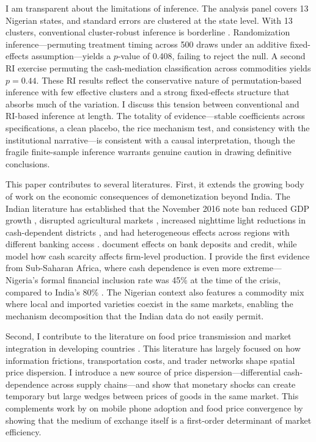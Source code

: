 \documentclass[12pt]{article}
\begin{document}
I am transparent about the limitations of inference. The analysis panel covers 13 Nigerian states, and standard errors are clustered at the state level. With 13 clusters, conventional cluster-robust inference is borderline \citep{cameron2008bootstrap, mackinnon2023cluster}. Randomization inference---permuting treatment timing across 500 draws under an additive fixed-effects assumption---yields a $p$-value of 0.408, failing to reject the null. A second RI exercise permuting the cash-mediation classification across commodities yields $p = 0.44$. These RI results reflect the conservative nature of permutation-based inference with few effective clusters and a strong fixed-effects structure that absorbs much of the variation. I discuss this tension between conventional and RI-based inference at length. The totality of evidence---stable coefficients across specifications, a clean placebo, the rice mechanism test, and consistency with the institutional narrative---is consistent with a causal interpretation, though the fragile finite-sample inference warrants genuine caution in drawing definitive conclusions.

This paper contributes to several literatures. First, it extends the growing body of work on the economic consequences of demonetization beyond India. The Indian literature has established that the November 2016 note ban reduced GDP growth \citep{chodorow-reich2020}, disrupted agricultural markets \citep{aggarwal2022demonetization, das2020}, increased nighttime light reductions in cash-dependent districts \citep{subramaniam2020}, and had heterogeneous effects across regions with different banking access \citep{lahiri2020}. \citet{karmakar2019} document effects on bank deposits and credit, while \citet{crouzet2023} model how cash scarcity affects firm-level production. I provide the first evidence from Sub-Saharan Africa, where cash dependence is even more extreme---Nigeria's formal financial inclusion rate was 45\% at the time of the crisis, compared to India's 80\% \citep{efina2022, world_bank2021findex}. The Nigerian context also features a commodity mix where local and imported varieties coexist in the same markets, enabling the mechanism decomposition that the Indian data do not easily permit.

Second, I contribute to the literature on food price transmission and market integration in developing countries \citep{aker2010information, aker2017, minten2013, fafchamps2006}. This literature has largely focused on how information frictions, transportation costs, and trader networks shape spatial price dispersion. I introduce a new source of price dispersion---differential cash-dependence across supply chains---and show that monetary shocks can create temporary but large wedges between prices of goods in the same market. This complements work by \citet{aker2010information} on mobile phone adoption and food price convergence by showing that the medium of exchange itself is a first-order determinant of market efficiency.
\end{document}

